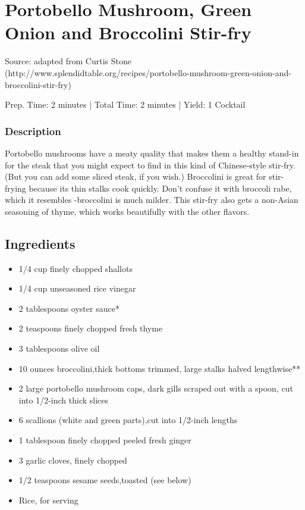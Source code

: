 \section{Portobello Mushroom, Green Onion and Broccolini Stir-fry}

Source: adapted from Curtis Stone (http://www.splendidtable.org/recipes/portobello-mushroom-green-onion-and-broccolini-stir-fry)

\begin{center}
Prep. Time: 2 minutes |
Total Time: 2 minutes | 
Yield: 1 Cocktail
\end{center}

\subsubsection{Description}

Portobello mushrooms have a meaty quality that makes them a healthy stand-in for the steak that you might expect to find in this kind of Chinese-style stir-fry. (But you can add some sliced steak, if you wish.) Broccolini is great for stir-frying because its thin stalks cook quickly. Don't confuse it with broccoli rabe, which it resembles -broccolini is much milder. This stir-fry also gets a non-Asian seasoning of thyme, which works beautifully with the other flavors.

\subsection{Ingredients}
\begin{itemize}
    \item 1/4 cup finely chopped shallots
    \item 1/4 cup unseasoned rice vinegar
    \item 2 tablespoons oyster sauce*
    \item 2 teaspoons finely chopped fresh thyme
    \item 3 tablespoons olive oil
    \item 10 ounces broccolini,thick bottoms trimmed, large stalks halved lengthwise**
    \item 2 large portobello mushroom caps, dark gills scraped out with a spoon, cut into 1/2-inch­ thick slices
    \item 6 scallions (white and green parts),cut into 1/2-inch lengths
    \item 1 tablespoon finely chopped peeled fresh ginger
    \item 3 garlic cloves, finely chopped
    \item 1/2 teaspoons sesame seeds,toasted (see below)
    \item Rice, for serving
\end{itemize}

